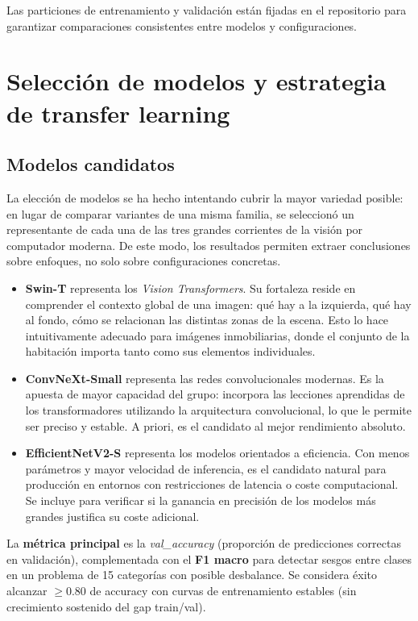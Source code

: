 \documentclass[11pt,a4paper]{article}
\begin{document}
Las particiones de entrenamiento y validación están fijadas en el repositorio para garantizar comparaciones consistentes entre modelos y configuraciones.

\section{Selección de modelos y estrategia de transfer learning}

\subsection{Modelos candidatos}

La elección de modelos se ha hecho intentando cubrir la mayor variedad posible: en lugar de comparar variantes de una misma familia, se seleccionó un representante de cada una de las tres grandes corrientes de la visión por computador moderna. De este modo, los resultados permiten extraer conclusiones sobre enfoques, no solo sobre configuraciones concretas.

\begin{itemize}\setlength\itemsep{2pt}
    \item \textbf{Swin-T} representa los \textit{Vision Transformers}. Su fortaleza reside en comprender el contexto global de una imagen: qué hay a la izquierda, qué hay al fondo, cómo se relacionan las distintas zonas de la escena. Esto lo hace intuitivamente adecuado para imágenes inmobiliarias, donde el conjunto de la habitación importa tanto como sus elementos individuales.
    \item \textbf{ConvNeXt-Small} representa las redes convolucionales modernas. Es la apuesta de mayor capacidad del grupo: incorpora las lecciones aprendidas de los transformadores utilizando la arquitectura convolucional, lo que le permite ser preciso y estable. A priori, es el candidato al mejor rendimiento absoluto.
    \item \textbf{EfficientNetV2-S} representa los modelos orientados a eficiencia. Con menos parámetros y mayor velocidad de inferencia, es el candidato natural para producción en entornos con restricciones de latencia o coste computacional. Se incluye para verificar si la ganancia en precisión de los modelos más grandes justifica su coste adicional.
\end{itemize}

La \textbf{métrica principal} es la \textit{val\_accuracy} (proporción de predicciones correctas en validación), complementada con el \textbf{F1 macro} para detectar sesgos entre clases en un problema de 15 categorías con posible desbalance. Se considera éxito alcanzar $\geq 0.80$ de accuracy con curvas de entrenamiento estables (sin crecimiento sostenido del gap train/val).
\end{document}
